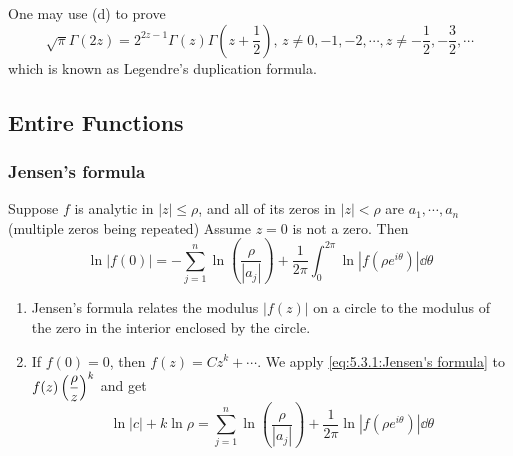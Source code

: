One may use (d) to prove 
\begin{equation}
    \sqrt{\pi}\Gamma(2z)=2^{2z-1}\Gamma(z)\Gamma(z+\frac{1}{2}),\,z\neq 0,-1,-2,\cdots,z\neq -\frac{1}{2},-\frac{3}{2},\cdots
\end{equation}
which is known as Legendre's duplication formula.

\subsection{Entire Functions}
\subsubsection{Jensen's formula}
\begin{theorem}\label{thm:5.3.1:Jensen's formula}
    Suppose  $ f  $ is analytic in  $ |z| \leq \rho $, and all of its zeros in  $ |z|<\rho $ are  $ a_1,\cdots,a_n $ (multiple zeros being repeated) Assume  $ z=0  $ is not a zero. Then 
    \begin{equation}
        \ln |f(0)|=-\sum_{j=1}^n\ln\left(\frac{\rho}{|a_j|}\right)+\frac{1}{2\pi }\int_0^{2\pi}\ln|f(\rho e^{i\theta})|\dd\theta\label{eq:5.3.1:Jensen's formula}
    \end{equation}  
\end{theorem}
\begin{remark}
    \begin{enumerate}[label=(\arabic*)]
        \item Jensen's formula relates the modulus  $ |f(z)| $ on a circle to the modulus of the zero in the interior enclosed by the circle.
        \item If  $ f(0)=0 $, then  $ f(z)=Cz^k+\cdots $. We apply  \eqref{eq:5.3.1:Jensen's formula} to  $ f(z)\displaystyle\left(\frac{\rho}{z}\right)^k $ and get 
        \begin{equation}
            \ln |c|+k\ln \rho=\sum_{j=1}^n\ln\left(\frac{\rho}{|a_j|}\right)+\frac{1}{2\pi }\ln|f(\rho e^{i\theta})|\dd\theta
        \end{equation}
    \end{enumerate}

\end{remark}
